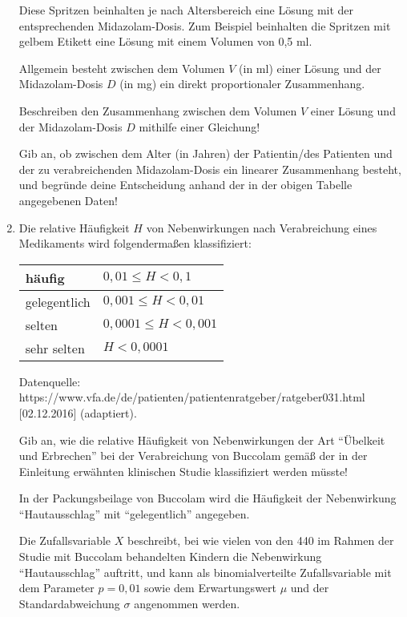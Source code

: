 \begin{langesbeispiel}
\begin{enumerate}
	Diese Spritzen beinhalten je nach Altersbereich eine Lösung mit der entsprechenden Midazolam-Dosis. Zum Beispiel beinhalten die Spritzen mit gelbem Etikett eine Lösung mit einem Volumen von 0,5 ml. 
	
	Allgemein besteht zwischen dem Volumen $V$ (in ml) einer Lösung und der Midazolam-Dosis $D$ (in mg) ein direkt proportionaler Zusammenhang.\leer
	
 Beschreiben den Zusammenhang zwischen dem Volumen $V$ einer Lösung und der Midazolam-Dosis $D$ mithilfe einer Gleichung!\leer

 Gib an, ob zwischen dem Alter (in Jahren) der Patientin/des Patienten und der zu verabreichenden Midazolam-Dosis ein linearer Zusammenhang besteht, und begründe deine Entscheidung anhand der in der obigen Tabelle angegebenen Daten!\leer

\item Die relative Häufigkeit $H$ von Nebenwirkungen nach Verabreichung eines Medikaments wird folgendermaßen klassifiziert:

\begin{center}
	\begin{tabular}{|l|l|}\hline
	häufig&$0,01\leq H<0,1$\\ \hline
	gelegentlich&$0,001\leq H<0,01$\\ \hline
	selten&$0,0001\leq H<0,001$\\ \hline
	sehr selten&$H<0,0001$\\ \hline	
	\end{tabular}
\end{center}
\begin{scriptsize}\begin{singlespace}Datenquelle: https://www.vfa.de/de/patienten/patientenratgeber/ratgeber031.html [02.12.2016] (adaptiert).\end{singlespace}\end{scriptsize}

 Gib an, wie die relative Häufigkeit von Nebenwirkungen der Art "`Übelkeit und Erbrechen"' bei der Verabreichung von Buccolam gemäß der in der Einleitung erwähnten klinischen Studie klassifiziert werden müsste!\leer

 In der Packungsbeilage von Buccolam wird die Häufigkeit der Nebenwirkung "`Hautausschlag"' mit "`gelegentlich"' angegeben. 

Die Zufallsvariable $X$ beschreibt, bei wie vielen von den 440 im Rahmen der Studie mit Buccolam behandelten Kindern die Nebenwirkung "`Hautausschlag"' auftritt, und kann als binomialverteilte Zufallsvariable mit dem Parameter $p=0,01$ sowie dem Erwartungswert $\mu$ und der Standardabweichung $\sigma$ angenommen werden. 


\end{enumerate}
\end{langesbeispiel}
